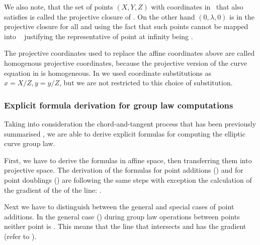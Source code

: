 
We also note, that the set of points $(X,Y,Z)$ with coordinates in  \mathFormulaFieldArbitraryClosure ~that also satisfies   is called the projective closure of  . On the other hand $(0,\lambda,0)$ is in the projective closure for all \mathFormulaIsInSet{\lambda}{\mathFormulaFieldArbitraryClosure} and using the fact that such points cannot be mapped into \mathFormulaAffinePlane~ justifying the representative of point at infinity being .

The projective coordinates   used to replace the  affine coordinates above are called homogenous projective coordinates, because the projective version of the curve equation in  is homogeneous.  In  we used coordinate substitutions as $x = X/Z, y = y/Z$, but we are not restricted to this choice of substitution.



\subsubsection{Explicit formula derivation for group law computations}
\label{ssec:ch1.explicitformulaforgrouplaw}

Taking into consideration the chord-and-tangent process that has been previously summarised  , we are able 
to derive explicit formulas for computing the elliptic curve group law. 

First, we have to derive the formulas in affine space, then transferring them into projective space.
The derivation of the formulas for point additions () and for point doublings () are following the same steps with  exception the calculation of the gradient of the \mathFormulaEllipticCurveGradientOfLine of the line: \mathFormulaEllipticCurveLineEquation. 

Next we have to distinguish between the general and special cases of point additions. In the general case () during group law operations between points neither point is \mathFormulaEllipticCurvePointAtInfinity.   This means that the line \mathFormulaEllipticCurveLineEquation that intersects   and  has the gradient  (refer to ).

